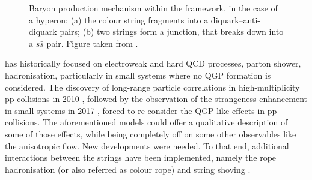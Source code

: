 \begin{figure}[t]
\hspace*{-1.25cm}
\caption{Baryon production mechanism within the \Pythia framework, in the case of a \rmXiM hyperon: (a) the colour string fragments into a diquark--anti-diquark pairs; (b) two strings form a junction, that breaks down into a $s\bar{s}$ pair. Figure taken from \cite{adolfssonQCDChallengesPp2020}.}
	\label{fig:BaryonProductionMechanisms}
\end{figure}

\Pythia has historically focused on electroweak and hard QCD processes, parton shower, hadronisation, particularly in small systems where no QGP formation is considered. The discovery of long-range particle correlations in high-multiplicity pp collisions in 2010 \cite{cmscollaborationObservationLongRangeNearSide2010, chatrchyanObservationLongrangeNearside2013, rolandLongrangeCorrelationsHigh2015}, followed by the observation of the strangeness enhancement in small systems in 2017 \cite{alicecollaborationEnhancedProductionMultistrange2017}, forced to re-consider the QGP-like effects in pp collisions. The aforementioned models could offer a qualitative description of some of those effects, while being completely off on some other observables like the anisotropic flow. New developments were needed. To that end, additional interactions between the strings have  been implemented, namely the rope hadronisation (or also referred as colour rope) and string shoving \cite{bierlichComprehensiveGuidePhysics2022}.

